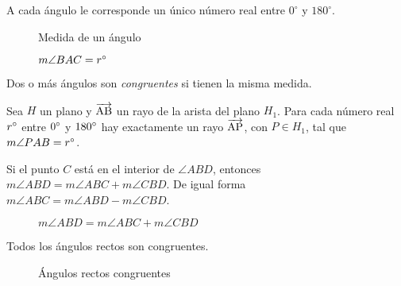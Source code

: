 \begin{postulate}
    A cada ángulo le corresponde un único número real entre $0^{\circ}$ y $180^{\circ}$.

\begin{figure}[!h]
    \centering
    
    \label{fig:ang-medida}
    \caption{Medida de un ángulo}
    \caption{$m\angle{BAC}=r^{\circ}$}
\end{figure}

\end{postulate}

\clearpage

\begin{definition}
    Dos o más ángulos son \textit{congruentes} si tienen la misma medida.
\end{definition}


\begin{postulate}
    Sea $H$ un plano y $\overrightarrow{\rm AB}$ un rayo de la arista del plano $H_1$. Para cada número real $r^{\circ}$ entre $0^{\circ}$ y $180^{\circ}$ hay exactamente un rayo $\overrightarrow{\rm AP}$, con $P \in H_1$, tal que $m\angle{PAB} = r^{\circ}$.

    \begin{figure}[!h]
        \centering
        
        \label{fig:ang-construct}
    \end{figure}
    
\end{postulate}

\begin{postulate}
    Si el punto $C$ está en el interior de $\angle{ABD}$, entonces $m\angle{ABD} = m\angle{ABC} + m\angle{CBD}$. De igual forma $m\angle{ABC} = m\angle{ABD} - m\angle{CBD}$.


    \begin{figure}[!h]
        \centering
        
        \label{fig:ang-suma}
        \caption{$m\angle{ABD} = m\angle{ABC} + m\angle{CBD}$}
    \end{figure}
    
\end{postulate}

\begin{postulate}
    Todos los ángulos rectos son congruentes.
    
    \begin{figure}[!h]
        \centering
        
        \caption{Ángulos rectos congruentes}
        \label{fig:ang-rect-cong}
    \end{figure}
    
\end{postulate}


